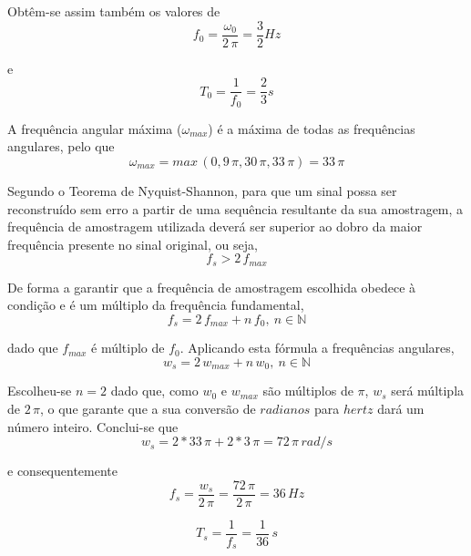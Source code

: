 \documentclass[a4paper]{article}
\begin{document}
\noindent Obtêm-se assim também os valores de
\begin{equation}
	f_0 = \frac{\omega_0}{2 \, \pi} = \frac{3}{2} Hz
\end{equation}

\noindent e
\begin{equation}
	T_0 = \frac{1}{f_0} = \frac{2}{3} s
\end{equation}

\noindent A frequência angular máxima ($\omega_{max}$) é a máxima de todas as frequências angulares, pelo que
\begin{equation}
	\omega_{max} = max \, (0, 9 \, \pi, 30 \, \pi, 33 \, \pi) = 33 \, \pi
\end{equation}

\noindent Segundo o Teorema de Nyquist-Shannon, para que um sinal possa ser reconstruído sem erro a partir de uma sequência resultante da sua amostragem, a frequência de amostragem utilizada deverá ser superior ao dobro da maior frequência presente no sinal original, ou seja,
\begin{equation}
	f_s > 2 \, f_{max}
\end{equation}

\noindent De forma a garantir que a frequência de amostragem escolhida obedece à condição e é um múltiplo da frequência fundamental,
\begin{equation}
	f_s = 2 \, f_{max} + n \, f_0, ~ n \in \mathbb{N}
\end{equation}

\noindent dado que $f_{max}$ é múltiplo de $f_0$. Aplicando esta fórmula a frequências angulares,
\begin{equation}
	w_s = 2 \, w_{max} + n \, w_0, ~ n \in \mathbb{N}
\end{equation}

\noindent Escolheu-se $n = 2$ dado que, como $w_0$ e $w_{max}$ são múltiplos de $\pi$, $w_s$ será múltipla de $2 \, \pi$, o que garante que a sua conversão de $radianos$ para $hertz$ dará um número inteiro. Conclui-se que
\begin{equation}
	w_s = 2 * 33 \, \pi + 2 * 3 \, \pi = 72 \, \pi \, rad/s
\end{equation}

\noindent e consequentemente
\begin{equation}
	f_s = \frac{w_s}{2 \, \pi} = \frac{72 \, \pi}{2 \, \pi} = 36 \, Hz
\end{equation}

\begin{equation}
	T_s = \frac{1}{f_s} = \frac{1}{36} \, s
\end{equation}
\end{document}
